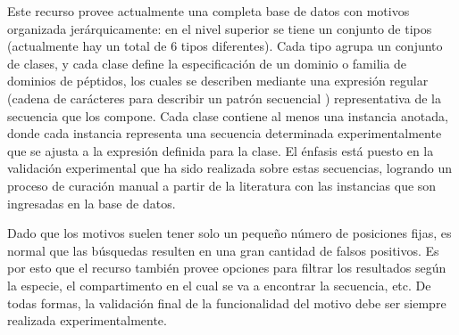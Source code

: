 
Este recurso provee actualmente una completa base de datos con motivos organizada jerárquicamente: en el nivel superior se tiene un conjunto de tipos (actualmente hay un total de 6 tipos diferentes). 
Cada tipo agrupa un conjunto de clases, y cada clase define la especificación de un dominio o familia de dominios de péptidos, 
los cuales se describen mediante una expresión regular (cadena de carácteres para describir un patrón secuencial \cite{regex}) representativa de la secuencia que los compone.
Cada clase contiene al menos una instancia anotada, donde cada instancia representa una secuencia determinada experimentalmente que se ajusta a la expresión definida para la clase.
El énfasis está puesto en la validación experimental que ha sido realizada sobre estas secuencias, logrando un proceso de curación manual a partir de la literatura con las instancias que son ingresadas en la base de datos.

Dado que los motivos suelen tener solo un pequeño número de posiciones fijas, es normal que las búsquedas resulten en una gran cantidad de falsos positivos.  
Es por esto que el recurso también provee opciones para filtrar los resultados según la especie, el compartimento en el cual se va a encontrar la secuencia, etc. 
De todas formas, la validación final de la funcionalidad del motivo debe ser siempre realizada experimentalmente.

